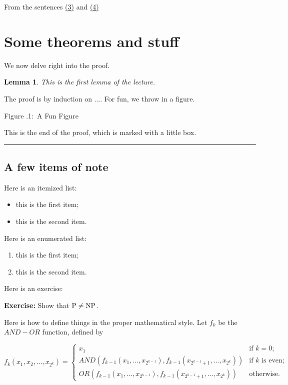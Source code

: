 \documentclass[twoside]{article}
\newcounter{lecnum}
\newcommand{\fig}[3]{
			\vspace{#2}
			\begin{center}
			Figure \thelecnum.#1:~#3
			\end{center}
	}
\newtheorem{lemma}[theorem]{Lemma}
\newenvironment{proof}{{\bf Proof:}}{\hfill\rule{2mm}{2mm}}
\begin{document}
From the sentences \hyperlink{fig3}{(3)} and \hyperlink{fig4}{(4)}


\section{Some theorems and stuff} %

We now delve right into the proof.

\begin{lemma}
This is the first lemma of the lecture.
\end{lemma}

\begin{proof}
The proof is by induction on $\ldots$.
For fun, we throw in a figure.
\fig{1}{1in}{A Fun Figure}

This is the end of the proof, which is marked with a little box.
\end{proof}

\subsection{A few items of note}

Here is an itemized list:
\begin{itemize}
\item this is the first item;
\item this is the second item.
\end{itemize}

Here is an enumerated list:
\begin{enumerate}
\item this is the first item;
\item this is the second item.
\end{enumerate}

Here is an exercise:

{\bf Exercise:}  Show that ${\rm P}\ne{\rm NP}$.

Here is how to define things in the proper mathematical style.
Let $f_k$ be the $AND-OR$ function, defined by

\[ f_k(x_1, x_2, \ldots, x_{2^k}) = \left\{ \begin{array}{ll}

	x_1 & \mbox{if $k = 0$;} \\

	AND(f_{k-1}(x_1, \ldots, x_{2^{k-1}}),
	   f_{k-1}(x_{2^{k-1} + 1}, \ldots, x_{2^k}))
	 & \mbox{if $k$ is even;} \\

	OR(f_{k-1}(x_1, \ldots, x_{2^{k-1}}),
	   f_{k-1}(x_{2^{k-1} + 1}, \ldots, x_{2^k}))	
	& \mbox{otherwise.} 
	\end{array}
	\right. \]
\end{document}
